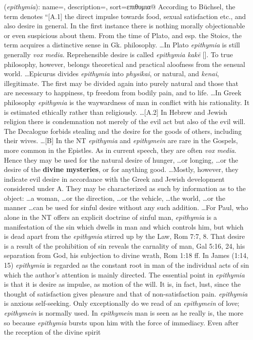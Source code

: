 \item[Craving,]

(\textit{epithymia}):
{
    name=,
    description={},
    sort=επιθυμια@
}
According to Büchsel, the term denotes ``[A.1] the direct impulse towards food, sexual satisfaction etc., and also desire in general. In the first instance there is nothing morally objectionable or even suspicious about them. From the time of Plato, and esp. the Stoics, the term acquires a distinctive sense in Gk. philosophy. \ldots In Plato \emph{epithymia} is still generally \emph{vox media}. Reprehensible desire is called \emph{epithymia kakē} []. To true philosophy, however, belongs theoretical and practical aloofness from the sensual world. \ldots Epicurus divides \emph{epithymia} into \emph{physikai}, or natural, and \emph{kenai}, illegitimate. The first may be divided again into purely natural and those that are necessary to happiness, tp freedom from bodily pain, and to life. \ldots In Greek philosophy \emph{epithymia} is the waywardness of man in conflict with his rationality. It is estimated ethically rather than religiously. \ldots [A.2] In Hebrew and Jewish religion there is condemnation not merely of the evil act but also of the evil will. The Decalogue forbids stealing and the desire for the goods of others, including their wives. \ldots [B] In the NT \emph{epithymia} and \emph{epithymein} are rare in the Gospels, more common in the Epistles. As in current speech, they are often \emph{vox media}. Hence they may be used for the natural desire of hunger, \ldots or longing, \ldots or the desire of the \textbf{divine mysteries}, or for anything good. \ldots Mostly, however, they indicate evil desire in accordance with the Greek and Jewish development considered under A. They may be characterized  as such by information as to the object: \ldots a woman, \ldots or the direction, \ldots or the vehicle, \ldots the world, \ldots or the manner \ldots can be used for sinful desire without any such addition. \ldots For Paul, who alone in the NT offers an explicit doctrine of sinful man, \emph{epithymia} is a manifestation of the sin which  dwells in man and which controls him, but which is dead apart from the \emph{epithymia} stirred up by the Law, Rom 7:7, 8. That desire is a result of the prohibition of sin reveals the carnality of man, Gal 5:16, 24, his separation from God, his subjection to divine wrath, Rom 1:18 ff. In James (1:14, 15) \emph{epithymia} is regarded as the constant root in man of the individual acts of sin which the author's attention is mainly directed. The essential point in \emph{epithymia} is that it is desire as impulse, as motion of the will. It is, in fact, lust, since the thought of satisfaction gives pleasure and that of non-satisfaction pain. \emph{epithymia} is anxious self-seeking. Only exceptionally do we read of an \emph{epithymein} of love; \emph{epithymein} is normally used. In \emph{epithymein} man is seen as he really is, the more so because \emph{epithymia} bursts upon him with the force of immediacy. Even after the reception of the divine spirit 